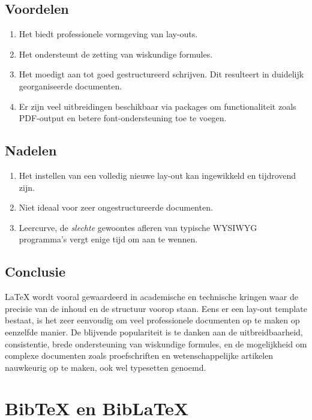 \subsection{Voordelen}
\begin{enumerate}
    \item Het biedt professionele vormgeving van lay-outs.
    \item Het ondersteunt de zetting van wiskundige formules.
    \item Het moedigt aan tot goed gestructureerd schrijven. Dit resulteert in duidelijk georganiseerde documenten.
    \item Er zijn veel uitbreidingen beschikbaar via packages om functionaliteit zoals PDF-output en betere font-ondersteuning toe te voegen.
\end{enumerate}

\subsection{Nadelen}
\begin{enumerate}
    \item Het instellen van een volledig nieuwe lay-out kan ingewikkeld en tijdrovend zijn.
    \item Niet ideaal voor zeer ongestructureerde documenten.
    \item Leercurve, de \emph{slechte} gewoontes afleren van typische \acrshort{WYSIWYG} programma's vergt enige tijd om aan te wennen.
\end{enumerate}

\subsection{Conclusie}
\LaTeX{} \autocite{Oetiker2023} wordt vooral gewaardeerd in academische en technische kringen waar de precisie van de inhoud en de structuur voorop staan. Eens er een lay-out template bestaat, is het zeer eenvoudig om veel professionele documenten op te maken op eenzelfde manier. De blijvende populariteit is te danken aan de uitbreidbaarheid, consistentie, brede ondersteuning van wiskundige formules, en de mogelijkheid om complexe documenten zoals proefschriften en wetenschappelijke artikelen nauwkeurig op te maken, ook wel typesetten genoemd.


\section{BibTeX en BibLaTeX}

